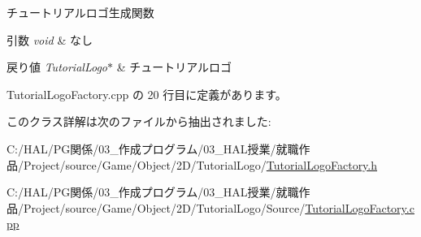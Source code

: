 チュートリアルロゴ生成関数 


\begin{DoxyParams}{引数}
{\em void} & なし \\
\hline
\end{DoxyParams}

\begin{DoxyRetVals}{戻り値}
{\em Tutorial\+Logo$\ast$} & チュートリアルロゴ \\
\hline
\end{DoxyRetVals}


 Tutorial\+Logo\+Factory.\+cpp の 20 行目に定義があります。



このクラス詳解は次のファイルから抽出されました\+:\begin{DoxyCompactItemize}
\item 
C\+:/\+H\+A\+L/\+P\+G関係/03\+\_\+作成プログラム/03\+\_\+\+H\+A\+L授業/就職作品/\+Project/source/\+Game/\+Object/2\+D/\+Tutorial\+Logo/\mbox{\hyperlink{_tutorial_logo_factory_8h}{Tutorial\+Logo\+Factory.\+h}}\item 
C\+:/\+H\+A\+L/\+P\+G関係/03\+\_\+作成プログラム/03\+\_\+\+H\+A\+L授業/就職作品/\+Project/source/\+Game/\+Object/2\+D/\+Tutorial\+Logo/\+Source/\mbox{\hyperlink{_tutorial_logo_factory_8cpp}{Tutorial\+Logo\+Factory.\+cpp}}\end{DoxyCompactItemize}
